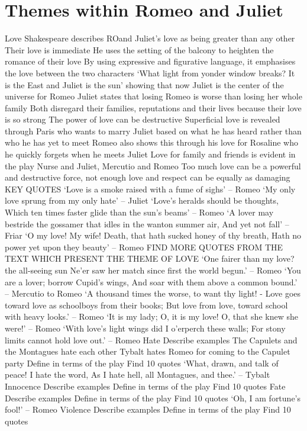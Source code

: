 \documentclass{article}
\begin{document}
\section{Themes within Romeo and Juliet}
\begin{outline}
\1 Love
\2 Shakespeare describes RO\omeo and Juliet's love as being greater than any other
\2 Their love is immediate
\2 He uses the setting of the balcony to heighten the romance of their love
\2 By using expressive and figurative language, it emphasises the love between the two characters
\2 `What light from yonder window breaks? It is the East and Juliet is the sun' showing that now Juliet is the center of the universe for Romeo
\2 Juliet states that losing Romeo is worse than losing her whole family
\2 Both disregard their families, reputations and their lives because their love is so strong
\2 The power of love can be destructive
\2 Superficial love is revealed through Paris who wants to marry Juliet based on what he has heard rather than who he has yet to meet
\2 Romeo also shows this through his love for Rosaline who he quickly forgets when he meets Juliet
\2 Love for family and friends is evident in the play
\2 Nurse and Juliet, Mercutio and Romeo
\2 Too much love can be a powerful and destructive force, not enough love and respect can be equally as damaging
\2 KEY QUOTES
\3 `Love is a smoke raised with a fume of sighs' -- Romeo
\3 `My only love sprung from my only hate' -- Juliet
\3 `Love's heralds should be thoughts, Which ten times faster glide than the sun's beams' -- Romeo
\3 `A lover may bestride the gossamer that idles in the wanton summer air, And yet not fall' -- Friar
\3 `O my love! My wife! Death, that hath sucked honey of thy breath, Hath no power yet upon they beauty' -- Romeo
\3 FIND MORE QUOTES FROM THE TEXT WHICH PRESENT THE THEME OF LOVE
\4 `One fairer than my love? the all-seeing sun Ne'er saw her match since first the world begun.' -- Romeo
\4 `You are a lover; borrow Cupid's wings, And soar with them above a common bound.' -- Mercutio to Romeo
\4 `A thousand times the worse, to want thy light! - Love goes toward love as schoolboys from their books; But love from love, toward school with heavy looks.' -- Romeo
\4 `It is my lady; O, it is my love! O, that she knew she were!' -- Romeo
\4 `With love's light wings did I o'erperch these walls; For stony limits cannot hold love out.' -- Romeo
\1 Hate
\2 Describe examples
\3 The Capulets and the Montagues hate each other
\3 Tybalt hates Romeo for coming to the Capulet party
\2 Define in terms of the play
\2 Find 10 quotes
\3 `What, drawn, and talk of peace! I hate the word, As I hate hell, all Montagues, and thee.' -- Tybalt
\3 
\1 Innocence
\2 Describe examples
\2 Define in terms of the play
\2 Find 10 quotes
\3 
\1 Fate
\2 Describe examples
\2 Define in terms of the play
\2 Find 10 quotes
\3 `Oh, I am fortune's fool!' -- Romeo
\1 Violence
\2 Describe examples
\2 Define in terms of the play
\2 Find 10 quotes
\end{outline}
\end{document}
